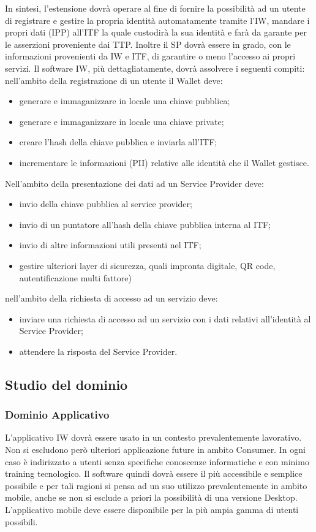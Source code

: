 In sintesi, l’estensione dovrà operare al fine di fornire la possibilità ad un utente di registrare e gestire la propria identità automatamente tramite l’IW, mandare i propri dati (IPP) all’ITF la quale custodirà la sua identità e farà da garante per le asserzioni proveniente dai TTP. Inoltre il SP dovrà essere in grado, con le informazioni provenienti da IW e ITF, di garantire o meno l’accesso ai propri servizi.
Il software IW, più dettagliatamente, dovrà assolvere i seguenti compiti:
nell’ambito della registrazione di un utente il Wallet deve:
\begin{itemize}
    \item generare e immaganizzare in locale una chiave pubblica;
    \item generare e immaganizzare in locale una chiave private;
    \item creare l’hash della chiave pubblica e inviarla all’ITF;
    \item incrementare le informazioni (PII) relative alle identità che il Wallet gestisce.
\end{itemize}
Nell’ambito della presentazione dei dati ad un Service Provider deve:
\begin{itemize}
    \item invio della chiave pubblica al service provider;
    \item invio di un puntatore all’hash della chiave pubblica interna al ITF;
    \item invio di altre informazioni utili presenti nel ITF;
    \item gestire ulteriori layer di sicurezza, quali impronta digitale, QR code, autentificazione multi fattore)
\end{itemize}
nell’ambito della richiesta di accesso ad un servizio deve:
\begin{itemize}
    \item inviare una richiesta di accesso ad un servizio con i dati relativi all’identità al Service Provider;
    \item attendere la risposta del Service Provider.
\end{itemize}

\subsection{Studio del dominio}
\subsubsection{Dominio Applicativo}
L’applicativo IW dovrà essere usato in un contesto prevalentemente lavorativo. Non si escludono però ulteriori applicazione future in ambito Consumer. In ogni caso è indirizzato a utenti senza specifiche conoscenze informatiche e con minimo training tecnologico. Il software quindi dovrà essere il più accessibile e semplice possibile e per tali ragioni si pensa ad un suo utilizzo prevalentemente in ambito mobile, anche se non si esclude a priori la possibilità di una versione Desktop. L’applicativo mobile deve essere disponibile per la più ampia gamma di utenti possibili.
